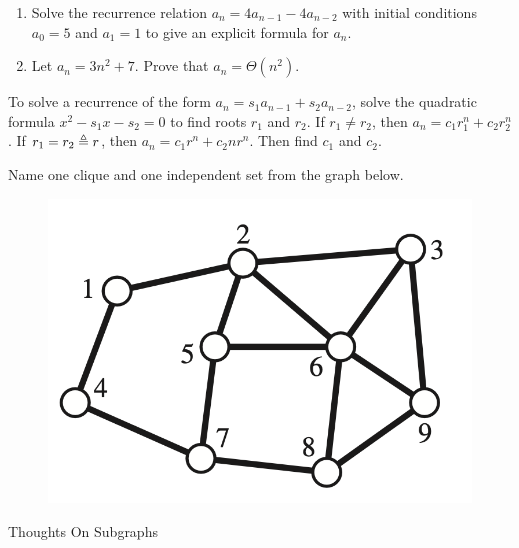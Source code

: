 \documentclass[10pt]{beamer}
\begin{document}
\begin{frame}
\small 

\begin{mygreenbox}[title=\text{Problems Quiz (recurrence, big O notation, algorithm efficiency)}]

\begin{enumerate}
\item Solve the recurrence relation $a_n = 4 a_{n-1} -4 a_{n-2}$  with initial conditions $a_0=5$ and $a_1=1$ to give an explicit formula for $a_n$. 
\item Let $a_n = 3n^2 + 7$. Prove that $a_n = \Theta (n^2)$.
\end{enumerate}
\end{mygreenbox}
\vfill 
\begin{myyellowbox}[title=\text{Reference material about second-order recurrences}]
To solve a recurrence of the form $a_n = s_1 a_{n-1} + s_2 a_{n-2}$, solve the quadratic formula $x^2 - s_1 x - s_2 =0$ to find roots $r_1$ and $r_2$. If $r_1 \neq r_2$, then $a_n = c_1 r_1^n + c_2 r_2^n$. If $r_1 = r_2 \triangleq r$, then  $a_n = c_1 r^n + c_2 n r^n$. Then find $c_1$ and $c_2$.
\end{myyellowbox}


\vfill 
\begin{myredbox}[title=Reading Quiz (Subgraphs)]
Name one clique and one independent set from the graph below.
\begin{figure}
\includegraphics[width=.4\linewidth]{images/graph.png}
\end{figure}
\end{myredbox}
\end{frame}



\begin{frame}[standout]
Thoughts On Subgraphs
\end{frame}
\end{document}
